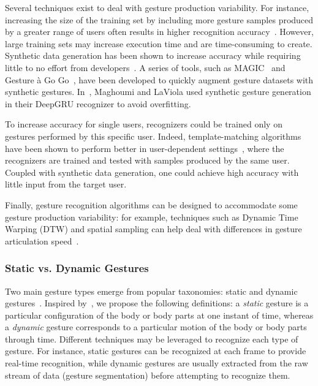 Several techniques exist to deal with gesture production variability. For instance, increasing the size of the training set by including more gesture samples produced by a greater range of users often results in higher recognition accuracy~\cite{Vatavu:2013}.
However, large training sets may increase execution time and are time-consuming to create. Synthetic data generation has been shown to increase accuracy while requiring little to no effort from developers~\cite{Taranta:2016, Leiva:2015}. A series of tools, such as MAGIC~\cite{Ashbrook:2010, Kohlsdorf:2011, Kohlsdorf:2013} and Gesture à Go Go~\cite{Leiva:2015}, have been developed to quickly augment gesture datasets with synthetic gestures. In~\cite{Maghoumi:2019}, Maghoumi and LaViola used synthetic gesture generation in their DeepGRU recognizer to avoid overfitting.

To increase accuracy for single users, recognizers could be trained only on gestures performed by this specific user. Indeed, template-matching algorithms have been shown to perform better in user-dependent settings~\cite{Vatavu:2013}, \ie where the recognizers are trained and tested with samples produced by the same user. 
Coupled with synthetic data generation, one could achieve high accuracy with little input from the target user. 

Finally, gesture recognition algorithms can be designed to accommodate some gesture production variability: for example, techniques such as Dynamic Time Warping (DTW) and spatial sampling can help deal with differences in gesture articulation speed~\cite{Taranta:2017, Vatavu:2013}.


\subsubsection{Static vs. Dynamic Gestures} \label{sec:state_of_the_art:overview:challenges:static-vs-dynamic}
Two main gesture types emerge from popular taxonomies: static and dynamic gestures~\cite{Aigner:2012,Vatavu:2008,Piumsomboon:2013,Choi:2014}. Inspired by~\cite{Vatavu:2008}, we propose the following definitions: a \textit{static} gesture is a particular configuration of the body or body parts at one instant of time, whereas a \textit{dynamic} gesture corresponds to a particular motion of the body or body parts through time. 
Different techniques may be leveraged to recognize each type of gesture. For instance, static gestures can be recognized at each frame to provide real-time recognition, while dynamic gestures are usually extracted from the raw stream of data (\ie gesture segmentation) before attempting to recognize them.


